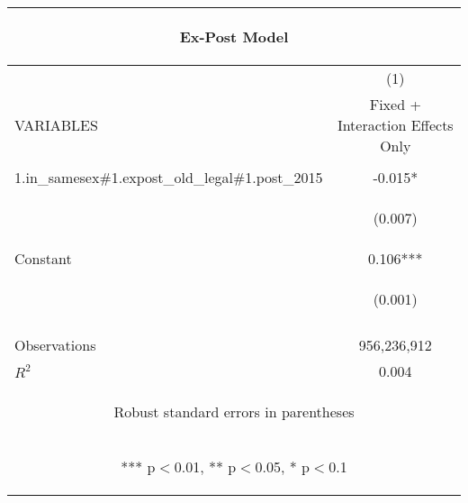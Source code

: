 \documentclass[]{article}
\begin{document}
\begin{center}
\begin{tabular}{lc}
\multicolumn{2}{c}{\begin{large}Ex-Post Model\end{large}} \\ \hline
 & (1) \\
VARIABLES & Fixed + Interaction Effects Only \\ \hline
\vspace{4pt} & \begin{footnotesize}\end{footnotesize} \\
1.in\_samesex\#1.expost\_old\_legal\#1.post\_2015 & -0.015* \\
\vspace{4pt} & \begin{footnotesize}(0.007)\end{footnotesize} \\
Constant & 0.106*** \\
 & \begin{footnotesize}(0.001)\end{footnotesize} \\
\vspace{4pt} & \begin{footnotesize}\end{footnotesize} \\
Observations & 956,236,912 \\
 $R^2$ & 0.004 \\ \hline
\multicolumn{2}{c}{\begin{footnotesize} Robust standard errors in parentheses\end{footnotesize}} \\
\multicolumn{2}{c}{\begin{footnotesize} *** p$<$0.01, ** p$<$0.05, * p$<$0.1\end{footnotesize}} \\
\end{tabular}
\end{center}
\end{document}
